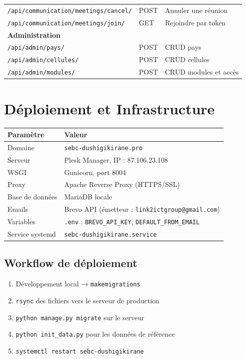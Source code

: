 \documentclass[12pt,a4paper]{article}
\begin{document}
\begin{longtable}{p{6cm}p{2cm}p{5cm}}
\texttt{/api/communication/meetings/cancel/} & POST & Annuler une réunion \\
\texttt{/api/communication/meetings/join/} & GET & Rejoindre par token \\
\midrule
\multicolumn{3}{l}{\textbf{\color{sebcblue}Administration}} \\
\texttt{/api/admin/pays/} & POST & CRUD pays \\
\texttt{/api/admin/cellules/} & POST & CRUD cellules \\
\texttt{/api/admin/modules/} & POST & CRUD modules et accès \\
\bottomrule
\end{longtable}

\section{Déploiement et Infrastructure}

\begin{techbox}
\begin{tabularx}{\textwidth}{lX}
\toprule
\textbf{Paramètre} & \textbf{Valeur} \\
\midrule
Domaine & \texttt{sebc-dushigikirane.pro} \\
Serveur & Plesk Manager, IP : 87.106.23.108 \\
WSGI & Gunicorn, port 8004 \\
Proxy & Apache Reverse Proxy (HTTPS/SSL) \\
Base de données & MariaDB locale \\
Emails & Brevo API (émetteur : \texttt{link2ictgroup@gmail.com}) \\
Variables & \texttt{.env} : \texttt{BREVO\_API\_KEY}, \texttt{DEFAULT\_FROM\_EMAIL} \\
Service systemd & \texttt{sebc-dushigikirane.service} \\
\bottomrule
\end{tabularx}
\end{techbox}

\subsection{Workflow de déploiement}

\begin{enumerate}
    \item Développement local → \texttt{makemigrations}
    \item \texttt{rsync} des fichiers vers le serveur de production
    \item \texttt{python manage.py migrate} sur le serveur
    \item \texttt{python init\_data.py} pour les données de référence
    \item \texttt{systemctl restart sebc-dushigikirane}
\end{enumerate}
\end{document}

